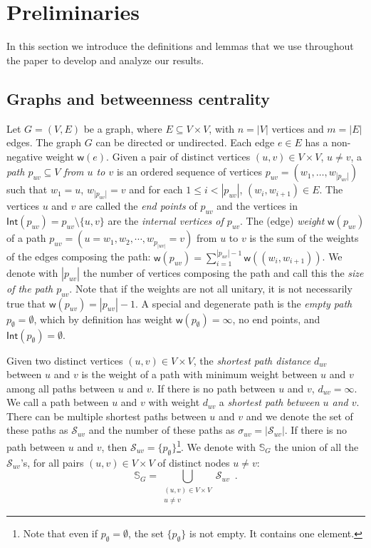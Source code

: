 \section{Preliminaries}\label{sec:prelims}
In this section we introduce the definitions and lemmas that we use throughout
the paper to develop and analyze our results.

\subsection{Graphs and betweenness centrality}\label{sec:graphprelims}
Let $G=(V,E)$ be a graph, where $E\subseteq V\times V$, with $n=|V|$ vertices
and $m=|E|$ edges. The graph $G$ can be directed or undirected. Each edge $e\in
E$ has a non-negative weight $\mathsf{w}(e)$. Given a pair of distinct vertices
$(u,v)\in V\times V$, $u\neq v$, a \emph{path $p_{uv}\subseteq V$ from $u$ to
$v$} is an ordered sequence of vertices $p_{uv}=(w_1,\dotsc,w_{|p_{uv}|})$ such
that $w_1=u$, $w_{|p_{uv}|}=v$ and for each $1\le i < |p_{uv}|$,
$(w_i,w_{i+1})\in E$. The vertices $u$ and $v$ are called the \emph{end points}
of $p_{uv}$ and the vertices in $\mathsf{Int}(p_{uv})=p_{uv}\setminus\{u,v\}$
are the \emph{internal vertices of $p_{uv}$}. The (edge) \emph{weight}
$\mathsf{w}(p_{uv})$ of a path $p_{uv}=(u=w_1,w_2,\cdots,w_{p_{|uv|}}=v)$ from
$u$ to $v$ is the sum of the weights of the edges composing the path:
$\mathsf{w}(p_{uv})=\sum_{i=1}^{|p_{uv}|-1}\mathsf{w}((w_i,w_{i+1}))$. We denote with
$|p_{uv}|$ the number of vertices composing the path and call this the
\emph{size of the path $p_{uv}$}. Note that if the weights are not all unitary,
it is not necessarily true that $\mathsf{w}(p_{uv})=|p_{uv}|-1$. A special and
degenerate path is the \emph{empty path} $p_{\emptyset}=\emptyset$, which by
definition has weight $\mathsf{w}(p_\emptyset)=\infty$, no end points, and
$\mathsf{Int}(p_\emptyset)=\emptyset$.

Given two distinct vertices $(u,v)\in V\times V$, the \emph{shortest path distance}
$d_{uv}$ between $u$ and $v$ is the weight of a path with minimum weight 
between $u$ and $v$ among all paths between $u$ and $v$. If there is no path
between $u$ and $v$, $d_{uv}=\infty$. We call a path between $u$ and $v$ with
weight $d_{uv}$ a \emph{shortest path between $u$ and $v$}. There can be
multiple shortest paths between $u$ and $v$ and we denote the set of these paths
as $\mathcal{S}_{uv}$ and the number of these paths as
$\sigma_{uv}=|\mathcal{S}_{uv}|$. If there is no path between $u$ and $v$, then
$\mathcal{S}_{uv}=\{p_\emptyset\}$\footnote{Note that even if
$p_\emptyset=\emptyset$, the set $\{p_\emptyset\}$ is not empty. It contains
one element.}.
We denote with $\mathbb{S}_G$ the union of all the $\mathcal{S}_{uv}$'s, for all
pairs $(u,v)\in V\times V$ of distinct nodes $u\neq v$: 
\[ \mathbb{S}_G=\bigcup_{\substack{(u,v)\in V\times V \\ u\neq v}}\mathcal{S}_{uv}\enspace.\]

